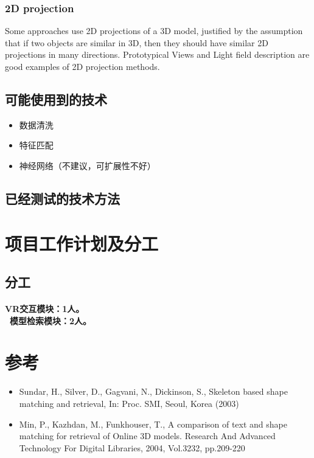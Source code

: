 \documentclass{article}
\begin{document}
\subsubsection{2D projection}
Some approaches use 2D projections of a 3D model, justified by the assumption that if two objects are similar in 3D, then they should have similar 2D projections in many directions. Prototypical Views and Light field description are good examples of 2D projection methods.

\subsection{可能使用到的技术}
\begin{itemize}
    \item 数据清洗
    \item 特征匹配
    \item 神经网络（不建议，可扩展性不好）
\end{itemize}
\subsection{已经测试的技术方法}

\section{项目工作计划及分工}
\subsection{分工}
\paragraph{VR交互模块：1人。 \\\ 模型检索模块：2人。
}

\section{参考}
\begin{itemize}
    \item Sundar, H., Silver, D., Gagvani, N., Dickinson, S., Skeleton based shape matching and retrieval, In: Proc. SMI, Seoul, Korea (2003)
    \item Min, P., Kazhdan, M., Funkhouser, T., A comparison of text and shape matching for retrieval of Online 3D models. Research And Advanced Technology For Digital Libraries, 2004, Vol.3232, pp.209-220
\end{itemize}
\end{document}
